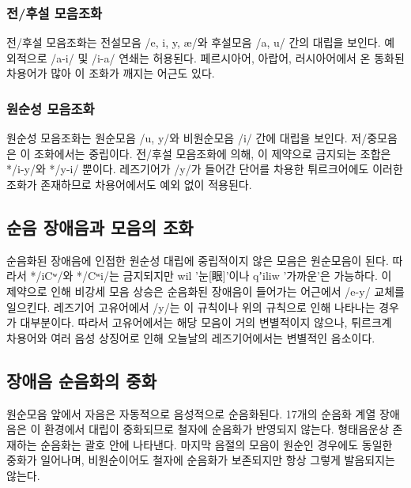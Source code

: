 \subsubsection{전/후설 모음조화}
전/후설 모음조화는 전설모음 /e, i, y, æ/와 후설모음 /a, u/ 간의 대립을 보인다. 예외적으로 /a-i/ 및 /i-a/ 연쇄는 허용된다. 페르시아어, 아랍어, 러시아어에서 온 동화된 차용어가 많아 이 조화가 깨지는 어근도 있다.
\subsubsection{원순성 모음조화}
원순성 모음조화는 원순모음 /u, y/와 비원순모음 /i/ 간에 대립을 보인다. 저/중모음은 이 조화에서는 중립이다. 전/후설 모음조화에 의해, 이 제약으로 금지되는 조합은 */i-y/와 */y-i/ 뿐이다. 레즈기어가 /y/가 들어간 단어를 차용한 튀르크어에도 이러한 조화가 존재하므로 차용어에서도 예외 없이 적용된다.
\subsection{순음 장애음과 모음의 조화}
순음화된 장애음에 인접한 원순성 대립에 중립적이지 않은 모음은 원순모음이 된다. 따라서 */iCʷ/와 */Cʷi/는 금지되지만 wil '눈[眼]'이나 qʼiliw '가까운'은 가능하다. 이 제약으로 인해 비강세 모음 상승은 순음화된 장애음이 들어가는 어근에서 /e-y/ 교체를 일으킨다. 레즈기어 고유어에서 /y/는 이 규칙이나 위의 규칙으로 인해 나타나는 경우가 대부분이다. 따라서 고유어에서는 해당 모음이 거의 변별적이지 않으나, 튀르크계 차용어와 여러 음성 상징어로 인해 오늘날의 레즈기어에서는 변별적인 음소이다.
\subsection{장애음 순음화의 중화}
원순모음 앞에서 자음은 자동적으로 음성적으로 순음화된다. 17개의 순음화 계열 장애음은 이 환경에서 대립이 중화되므로 철자에 순음화가 반영되지 않는다. 형태음운상 존재하는 순음화는 괄호 안에 나타낸다. 마지막 음절의 모음이 원순인 경우에도 동일한 중화가 일어나며, 비원순이어도 철자에 순음화가 보존되지만 항상 그렇게 발음되지는 않는다.